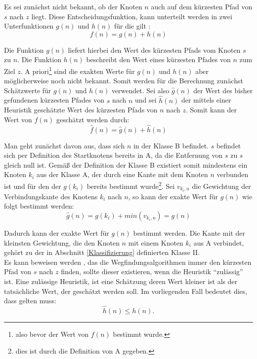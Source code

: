 		Es sei zunächst nicht bekannt, ob der Knoten $n$ auch auf dem kürzesten Pfad von $s$ nach $z$ liegt.
		Diese Entscheidungsfunktion, kann unterteilt werden in zwei Unterfunktionen $g(n)$ und $h(n)$ für die gilt \cite{Hart1968}:
		\begin{equation}
		f(n)=g(n)+h(n)
		\end{equation}
		
		Die Funktion $g(n)$ liefert hierbei den Wert des kürzesten Pfads vom Knoten $s$ zu $n$. Die Funktion $h(n)$ beschreibt den Wert eines kürzesten Pfades von $n$ zum Ziel $z$. A priori\footnote{also bevor der Wert von $f(n)$ bestimmt wurde.} sind die exakten Werte für $g(n)$ und $h(n)$ aber möglicherweise noch nicht bekannt. Somit werden für die Berechnung zunächst Schätzwerte für $g(n)$ und $h(n)$ verwendet. Sei also $\hat{g}(n)$ der Wert des bisher gefundenen kürzesten Pfades von $s$ nach $n$ und sei $\hat{h}(n)$ der mittels einer Heuristik geschätzte Wert des kürzesten Pfads von $n$ nach $z$. Somit kann der Wert von $f(n)$ geschätzt werden durch:
		\begin{equation}
			\hat{f}(n)=\hat{g}(n)+\hat{h}(n)
		\end{equation}
	
		Man geht zunächst davon aus, dass sich $n$ in der Klasse B befindet. $s$ befindet sich per Definition des Startknotens bereits in A, da die Entfernung von $s$ zu $s$ gleich null ist. Gemäß der Definition der Klasse B existiert somit mindestens ein Knoten $k_i$ aus der Klasse A, der durch eine Kante mit dem Knoten $n$ verbunden ist und für den der $g(k_i)$ bereits bestimmt wurde\footnote{dies ist durch die Definition von A gegeben.}. Sei $v_{k_i,n}$ die Gewichtung der Verbindungskante des Knotens $k_i$ nach $n$, so kann der exakte Wert für $g(n)$ wie folgt bestimmt werden:
		\begin{equation}
			\hat{g}(n)=g(k_i)+min(v_{k_i,n})=g(n)
		\end{equation}
		
		Dadurch kann der exakte Wert für $g(n)$ bestimmt werden. Die Kante mit der kleinsten Gewichtung, die den Knoten $n$ mit einem Knoten $k_i$ aus A verbindet, gehört zu der in Abschnitt \ref{Klassifizierung} definierten Klasse II.\\
		Es kann beweisen werden \cite{Hart1968}, das die Wegfindungsalgorithmen immer den kürzesten Pfad von $s$ nach $z$ finden, sollte dieser existieren, wenn die Heuristik "`zulässig"' ist. Eine zulässige Heuristik, ist eine Schätzung deren Wert kleiner ist als der tatsächliche Wert, der geschätzt werden soll. Im vorliegenden Fall bedeutet dies, dass gelten muss:
		\begin{equation}
			\hat{h}(n)\le h(n).
		\end{equation}
		
